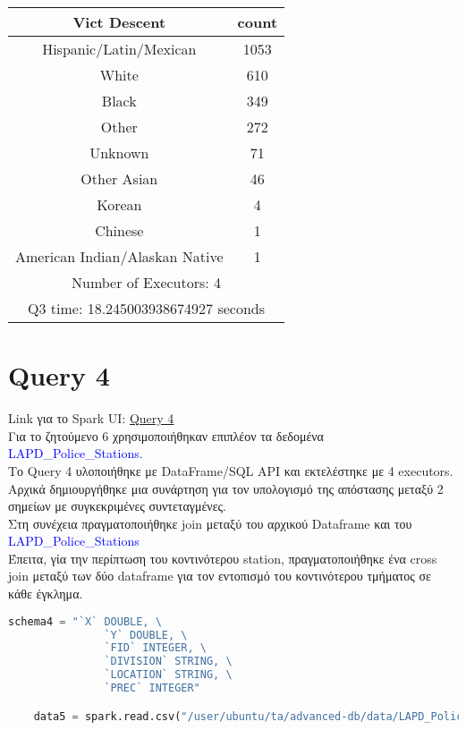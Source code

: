 \documentclass{article}
\begin{document}
\begin{center}
\begin{tabular}{|c|c|}
\hline
\textbf{Vict Descent} & \textbf{count} \\
\hline
Hispanic/Latin/Mexican & 1053 \\
White & 610 \\
Black & 349 \\
Other & 272 \\
Unknown & 71 \\
Other Asian & 46 \\
Korean & 4 \\
Chinese & 1 \\
American Indian/Alaskan Native & 1 \\
\hline
\multicolumn{2}{|c|}{Number of Executors: 4} \\
\multicolumn{2}{|c|}{Q3 time: 18.245003938674927 seconds} \\
\hline
\end{tabular}
\end{center}

\vspace{3mm}

\section{Query 4}

Link για το Spark UI: 
\href{http://83.212.81.191:18080/history/application_1705357398960_0017/jobs/} {Query 4} \\

Για το ζητούμενο 6 χρησιμοποιήθηκαν επιπλέον τα δεδομένα \textcolor{blue}{LAPD\_Police\_Stations}. \\
Το Query 4 υλοποιήθηκε με DataFrame/SQL API και εκτελέστηκε με 4 executors.  \\
Αρχικά δημιουργήθηκε μια συνάρτηση για τον υπολογισμό της απόστασης μεταξύ 2 σημείων με 
συγκεκριμένες συντεταγμένες. \\
Στη συνέχεια πραγματοποιήθηκε join μεταξύ του αρχικού Dataframe και του \textcolor{blue}{LAPD\_Police\_Stations}\\
Έπειτα, γία την περίπτωση του κοντινότερου station, πραγματοποιήθηκε ένα cross join μεταξύ των δύο dataframe
για τον εντοπισμό του κοντινότερου τμήματος σε κάθε έγκλημα. 

\vspace{3mm}

\begin{lstlisting}[language = Python]
    schema4 = "`X` DOUBLE, \
               `Y` DOUBLE, \
               `FID` INTEGER, \
               `DIVISION` STRING, \
               `LOCATION` STRING, \
               `PREC` INTEGER"

    data5 = spark.read.csv("/user/ubuntu/ta/advanced-db/data/LAPD_Police_Stations.csv", header=True, schema=schema4)


\end{lstlisting}
    
\end{document}
